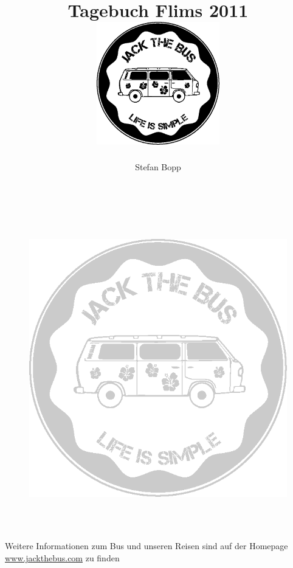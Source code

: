 \documentclass[11pt,nswissgerman]{article}
\begin{document}
\author{Stefan Bopp}
\title{\Huge Tagebuch Flims 2011\vspace{2cm}
\includegraphics[width=0.4\textwidth]{../Bilder/Logo/Logo.png}
}
\maketitle
\vfill
\tableofcontents

\newpage



\cfoot{\thepage}

\newpage

\begin{figure}[H]
    \centering
    \includegraphics[width=\textwidth,height=14cm, keepaspectratio]{../Bilder/Logo/Logo_trans.png}
    \label{img:Logo}
\end{figure}
\vfill
    \begin{center}
        {\huge  Weitere Informationen zum Bus und unseren Reisen sind auf der Homepage {\url{www.jackthebus.com}} zu finden}
\end{center}
\end{document}
